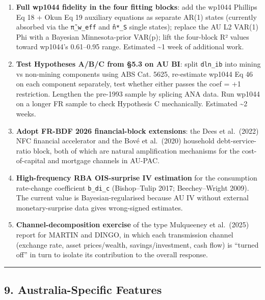 \documentclass[
]{article}
\providecommand{\tightlist}{%
  \setlength{\itemsep}{0pt}\setlength{\parskip}{0pt}}
\begin{document}
\begin{enumerate}
\def\labelenumi{\arabic{enumi}.}
\tightlist
\item
  \textbf{Full wp1044 fidelity in the four fitting blocks}: add the
  wp1044 Phillips Eq 18 + Okun Eq 19 auxiliary equations as separate
  AR(1) states (currently absorbed via the \texttt{π̃\_w\_eff} and
  \texttt{n̂*\_S} single states); replace the AU L2 VAR(1) Phi with a
  Bayesian Minnesota-prior VAR(p); lift the four-block R² values toward
  wp1044's 0.61--0.95 range. Estimated \textasciitilde1 week of
  additional work.
\item
  \textbf{Test Hypotheses A/B/C from §5.3 on AU BI}: split
  \texttt{dln\_ib} into mining vs non-mining components using ABS Cat.
  5625, re-estimate wp1044 Eq 46 on each component separately, test
  whether either passes the coef = +1 restriction. Lengthen the pre-1993
  sample by splicing ANA data. Run wp1044 on a longer FR sample to check
  Hypothesis C mechanically. Estimated \textasciitilde2 weeks.
\item
  \textbf{Adopt FR-BDF 2026 financial-block extensions}: the Dees et
  al.~(2022) NFC financial accelerator and the Bové et al.~(2020)
  household debt-service-ratio block, both of which are natural
  amplification mechanisms for the cost-of-capital and mortgage channels
  in AU-PAC.
\item
  \textbf{High-frequency RBA OIS-surprise IV estimation} for the
  consumption rate-change coefficient \texttt{b\_di\_c} (Bishop--Tulip
  2017; Beechey--Wright 2009). The current value is Bayesian-regularised
  because AU IV without external monetary-surprise data gives
  wrong-signed estimates.
\item
  \textbf{Channel-decomposition exercise} of the type Mulqueeney et
  al.~(2025) report for MARTIN and DINGO, in which each transmission
  channel (exchange rate, asset prices/wealth, savings/investment, cash
  flow) is ``turned off'' in turn to isolate its contribution to the
  overall response.
\end{enumerate}

\begin{center}\rule{0.5\linewidth}{0.5pt}\end{center}

\subsection{9. Australia-Specific
Features}\label{australia-specific-features}
\end{document}
